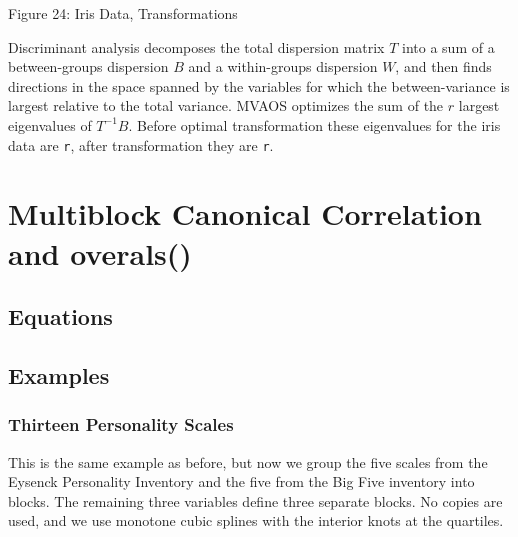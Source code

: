 \documentclass[
  12pt,
  letterpaper,
  DIV=11,
  numbers=noendperiod]{scrreprt}
\begin{document}
Figure 24: Iris Data, Transformations

Discriminant analysis decomposes the total dispersion matrix \(T\) into
a sum of a between-groups dispersion \(B\) and a within-groups
dispersion \(W\), and then finds directions in the space spanned by the
variables for which the between-variance is largest relative to the
total variance. MVAOS optimizes the sum of the \(r\) largest eigenvalues
of \(T^{-1}B\). Before optimal transformation these eigenvalues for the
iris data are \texttt{r}, after transformation they are \texttt{r}.


\chapter{Multiblock Canonical Correlation and
overals()}\label{multiblock-canonical-correlation-and-overals}

\section{Equations}\label{equations-7}

\section{Examples}\label{examples-7}

\subsection{Thirteen Personality
Scales}\label{thirteen-personality-scales-2}

This is the same example as before, but now we group the five scales
from the Eysenck Personality Inventory and the five from the Big Five
inventory into blocks. The remaining three variables define three
separate blocks. No copies are used, and we use monotone cubic splines
with the interior knots at the quartiles.
\end{document}
